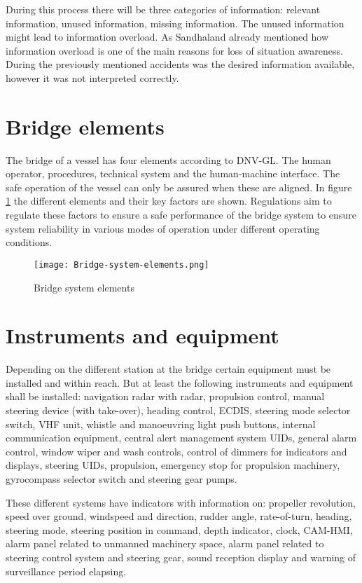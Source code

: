 During this process there will be three categories of information: relevant information, unused information, missing information. The unused information might lead to information overload. As Sandhaland already mentioned how information overload is one of the main reasons for loss of situation awareness. During the previously mentioned accidents was the desired information available, however it was not interpreted correctly.

\newpage
\section{Bridge elements}
The bridge of a vessel has four elements according to DNV-GL. The human operator, procedures, technical system and the human-machine interface. The safe operation of the vessel can only be assured when these are aligned. In figure \ref{fig:Bridge-system-elements} the different elements and their key factors are shown. Regulations aim to regulate these factors to ensure a safe performance of the bridge system to ensure system reliability in various modes of operation under different operating conditions. \cite{DNVGL2011}
\begin{figure}[H]
	\centering
	\texttt{[image: Bridge-system-elements.png]}
	\caption{Bridge system elements}
	\label{fig:Bridge-system-elements}
\end{figure}

\section{Instruments and equipment}
Depending on the different station at the bridge certain equipment must be installed and within reach. But at least the following instruments and equipment shall be installed: navigation radar with radar, propulsion control, manual steering device (with take-over), heading control, \ac{ECDIS}, steering mode selector switch, \ac{VHF} unit, whistle and manoeuvring light push buttons, internal communication equipment, central alert management system \ac{UID}s, general alarm control, window wiper and wash controls, control of dimmers for indicators and displays, steering \ac{UID}s, propulsion, emergency stop for propulsion machinery, gyrocompass selector switch and steering gear pumps.

These different systems have indicators with information on: propeller revolution, speed over ground, windspeed and direction, rudder angle, rate-of-turn, heading, steering mode, steering position in command, depth indicator, clock, \ac{CAM-HMI}, alarm panel related to unmanned machinery space, alarm panel related to steering control system and steering gear, sound reception display and warning of surveillance period elapsing. 


